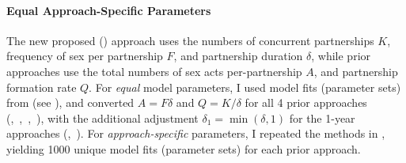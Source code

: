 \paragraph{Equal \vs Approach-Specific Parameters}
The new proposed (\np) approach uses the
numbers of concurrent partnerships $K$,
frequency of sex per partnership $F$,
and partnership duration $\delta$,
while prior approaches use the
total numbers of sex acts per-partnership $A$,
and partnership formation rate $Q$.
For \emph{equal} model parameters,
I used model fits (parameter sets) from \np (see ),
and converted $A = F \delta$ and $Q = K/\delta$ for all 4 prior approaches (\rd,~\ry,~\pd,~\py),
with the additional adjustment $\delta_1 = \min{(\delta,1)}$ for the 1-year approaches (\ry,~\py).
For \emph{approach-specific} parameters, I repeated the methods in ,
yielding 1000 unique model fits (parameter sets) for each prior approach.
